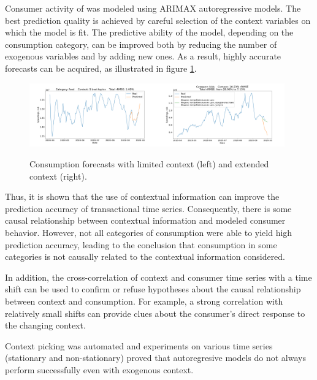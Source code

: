\documentclass[13pt, a4paper]{article}
\begin{document}
Consumer activity of was modeled using ARIMAX autoregressive models. The best prediction quality is achieved by careful selection of the context variables on which the model is fit. The predictive ability of the model, depending on the consumption category, can be improved both by reducing the number of exogenous variables and by adding new ones. As a result, highly accurate forecasts can be acquired, as illustrated in figure \ref{fig:gr14}.
\begin{figure}[h!]\vspace*{4pt}
	\centerline{\includegraphics[width=0.49\textwidth]{./visuals/gr12.png}\hspace{1mm}\includegraphics[width=0.49\textwidth]{./visuals/gr13.png}}
\caption{Consumption forecasts with limited context (left) and extended context (right).}
\label{fig:gr14}
\end{figure}

Thus, it is shown that the use of contextual information can improve the prediction accuracy of transactional time series. Consequently, there is some causal relationship between contextual information and modeled consumer behavior. However, not all categories of consumption were able to yield high prediction accuracy, leading to the conclusion that consumption in some categories is not causally related to the contextual information considered.

In addition, the cross-correlation of context and consumer time series with a time shift can be used to confirm or refuse hypotheses about the causal relationship between context and consumption. For example, a strong correlation with relatively small shifts can provide clues about the consumer's direct response to the changing context.

Context picking was automated and experiments on various time series (stationary and non-stationary) proved that autoregresive models do not always perform successfully even with exogenous context.
\end{document}
